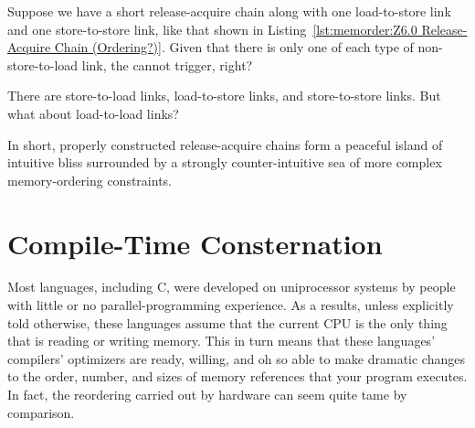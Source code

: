 \QuickQuiz{}
	Suppose we have a short release-acquire chain along with one
	load-to-store link and one store-to-store link, like that shown in
	Listing~\ref{lst:memorder:Z6.0 Release-Acquire Chain (Ordering?)}.
	Given that there is only one of each type of non-store-to-load
	link, the  cannot trigger, right?
 \QuickQuizEnd

\QuickQuiz{}
	There are store-to-load links, load-to-store links, and
	store-to-store links.
	But what about load-to-load links?
 \QuickQuizEnd

In short, properly constructed release-acquire chains form a peaceful
island of intuitive bliss surrounded by a strongly counter-intuitive
sea of more complex memory-ordering constraints.


\section{Compile-Time Consternation}
\label{sec:memorder:Compile-Time Consternation}

Most languages, including C, were developed on uniprocessor systems
by people with little or no parallel-programming experience.
As a results, unless explicitly told otherwise, these languages assume
that the current CPU is the only thing that is reading or writing memory.
This in turn means that these languages' compilers' optimizers
are ready, willing, and oh so able to make dramatic changes to the
order, number, and sizes of memory references that your program
executes.
In fact, the reordering carried out by hardware can seem quite tame
by comparison.

